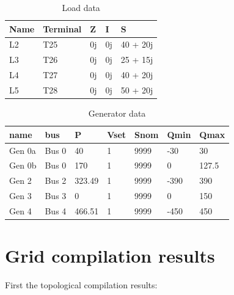\documentclass[nols,a4paper,twoside,symmetric,notoc,fleqn]{tufte-book}
\begin{document}
\begin{table}[ht]
	\begin{tabular}{|l|l|l|l|l|}
		\hline
		\rowcolor{maincolor}
		{\color{white}Name} & {\color{white}Terminal}    & {\color{white}Z}  & {\color{white}I}  & {\color{white}S}         \\ \hline
		L2 & T25 &  0j & 0j & 40 + 20j   \\ \hline
		L3 & T26 &  0j & 0j & 25 + 15j   \\ \hline
		L4 & T27 &  0j & 0j & 40 + 20j \\ \hline
		L5 & T28 &  0j & 0j & 50 + 20j \\ \hline
	\end{tabular}
	\caption{Load data}
	\label{tbl:IEEE5:load_data}
\end{table}


\begin{table}[ht]
	\begin{tabular}{|l|l|l|l|l|l|l|}
		\hline
		\rowcolor{maincolor}
		{\color{white}name}       & {\color{white}bus}      & {\color{white}P}      & {\color{white}Vset} & {\color{white}Snom} & {\color{white}Qmin} & {\color{white}Qmax}  \\ \hline
		Gen 0a & Bus 0  & 40     & 1    & 9999 & -30  & 30    \\ \hline
		Gen 0b & Bus 0  & 170    & 1    & 9999 & 0    & 127.5 \\ \hline
		Gen 2 & Bus 2  & 323.49 & 1    & 9999 & -390 & 390   \\ \hline
		Gen 3 & Bus 3  & 0      & 1    & 9999 & 0    & 150   \\ \hline
		Gen 4 & Bus 4  & 466.51 & 1    & 9999 & -450 & 450   \\ \hline
	\end{tabular}
	\caption{Generator data}
	\label{tbl:IEEE5:gen_data}
\end{table}





\newpage
\section{Grid compilation results}

First the topological compilation results:
\end{document}
